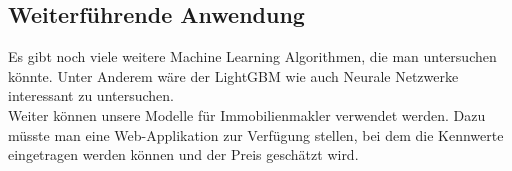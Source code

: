 \subsection{Weiterführende Anwendung}
Es gibt noch viele weitere Machine Learning Algorithmen, die man untersuchen könnte. Unter Anderem wäre der LightGBM wie auch Neurale Netzwerke interessant zu untersuchen.\\
Weiter können unsere Modelle für Immobilienmakler verwendet werden. Dazu müsste man eine Web-Applikation zur Verfügung stellen, bei dem die Kennwerte eingetragen werden können und der Preis geschätzt wird.


